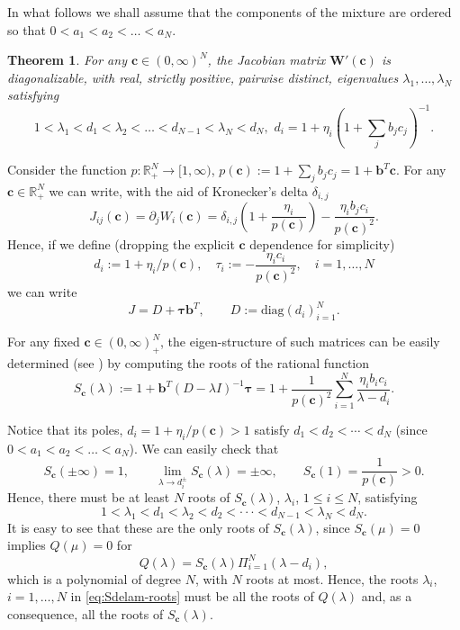 \documentclass[preprint]{elsarticle}
\newtheorem{theorem}{Theorem}[section]
\theoremstyle{definition}
\def\rpn{\mathbb{R}_+^N}
\newcommand{\bc}{\boldsymbol c}
\newcommand{\bb}{\boldsymbol b}
\newcommand{\bt}{\boldsymbol \tau}
\begin{document}
In what follows we shall assume that the components of the mixture are
ordered so that $0<a_1<a_2<\ldots<a_N$.


\begin{theorem} \label{th:jacobian}
For any  ${\boldsymbol  c}\in  (0,\infty)^N$,
  the Jacobian matrix ${\boldsymbol W}'({\boldsymbol c})$ is
  diagonalizable, with real, strictly positive, pairwise distinct, eigenvalues
  $\lambda_1,\dots,\lambda_N$ satisfying
  \begin{equation} \label{eq:Sdelam-roots}
 1< \lambda_1  <d_1 < \lambda_2  < \dots < d_{N-1} <
\lambda_N < d_N, \, \, d_i= 1+\eta_i(1+\sum_jb_j c_j)^{-1}.
\end{equation}


\end{theorem}
\begin{pf}
Consider the function $p:\rpn \rightarrow [1,\infty)$, 
$p({\boldsymbol c}):=1+\sum_jb_j c_j=1+\bb^T \bc$. 
 For any $\bc \in
\mathbb R_+^N$ we can write, with the aid
 of Kronecker's delta $\delta_{i,j}$
\begin{equation*}J_{ij}(\bc)=\partial_j W_i(\bc)=\delta_{i,j}
\left(1+\frac{\eta_i}{p(\bc)}\right)-\frac{\eta_i b_j c_i}{p(\bc)^2}. 
\end{equation*}
 Hence, if we define (dropping the explicit $\bc$ dependence for simplicity)
\begin{equation} \label{eq:D-def}
 d_i:= 1+\eta_i/p(\bc), \quad 
\tau_i:=-\frac{\eta_i c_i}{p(\bc)^2}, \quad i=1,\ldots, N
\end{equation}
we can write 
\begin{equation*}J=D+\bt \bb^T,   \qquad D:=\text{diag}(d_i)_{i=1}^N.
\end{equation*}

For any fixed $\bc \in (0,\infty)^N_+$, the
eigen-structure of such matrices can be easily determined
(see \cite{Donat3}) by computing the roots of the rational function
\begin{equation*}S_{\bc}(\lambda):=1+\bb^T(D-\lambda I)^{-1} \bt = 1+ \frac{1}{p(\bc)^2} \sum_{i=1}^N
\frac{\eta_i b_i c_i}{\lambda -d_i}.
\end{equation*}

Notice that  its poles, $d_i=1+\eta_i/p(\bc)>1$ satisfy $d_1<d_2<\cdots<d_N$ (since
$0<a_1<a_2<\ldots<a_N$). We can easily check that 
\[ S_{\bc}(\pm \infty)=1, \qquad \lim_{\lambda\to d_i^\pm}S_{\bc}(\lambda)=\pm
\infty, \qquad S_{\bc}(1)=\frac{1}{p(\bc)} >0. \]
  Hence, there must be at least $N$ roots of $S_{\bc}(\lambda)$,
$\lambda_i$, $1\leq i\leq N$,  satisfying
\begin{equation*} 
 1< \lambda_1 <d_1 < \lambda_2 < d_2 < \cdot\cdot\cdot < d_{N-1} <
\lambda_N < d_N. 
\end{equation*}
It is easy to see that these are the only roots of $S_{\bc}(\lambda)$, 
since  $S_{\bc}(\mu)=0$
implies $Q(\mu)=0$ for 
\[Q(\lambda)=S_{\bc}(\lambda)\Pi_{i=1}^N(\lambda-d_i),\] which is a
polynomial of degree $N$, with $N$ roots at most. Hence, the roots 
$\lambda_i$, $i=1,\ldots, N$ in \eqref{eq:Sdelam-roots} must be all
the roots of $Q(\lambda)$ and, as a consequence, all the roots of
$S_{\bc}(\lambda)$.


\end{pf}
\end{document}
